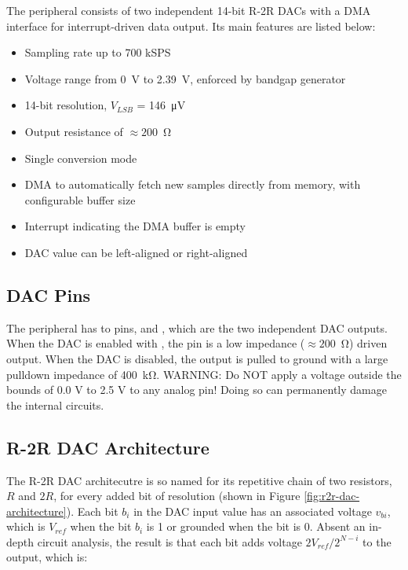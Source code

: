 The  peripheral consists of two independent 14-bit R-2R DACs with a DMA interface for interrupt-driven data output. Its main features are listed below:

\begin{itemize}
	\item Sampling rate up to 700 kSPS
	\item Voltage range from 0~\si{\volt} to 2.39~\si{\volt}, enforced by bandgap generator
	\item 14-bit resolution, $V_{LSB}$ = 146~\si{\micro\volt}
	\item Output resistance of $\approx200$~\si{\ohm}
	\item Single conversion mode
	\item DMA to automatically fetch new samples directly from memory, with configurable buffer size
	\item Interrupt indicating the DMA buffer is empty
	\item DAC value can be left-aligned or right-aligned
\end{itemize}



\subsection{DAC Pins}

The  peripheral has to pins,  and , which are the two independent DAC outputs. When the DAC is enabled with , the pin is a low impedance ($\approx200$~\si{\ohm}) driven output. When the DAC is disabled, the output is pulled to ground with a large pulldown impedance of 400~\si{\kilo\ohm}. WARNING: Do NOT apply a voltage outside the bounds of 0.0 V to 2.5 V to any analog pin! Doing so can permanently damage the internal circuits.



\subsection{R-2R DAC Architecture}

The R-2R DAC architecutre is so named for its repetitive chain of two resistors, $R$ and $2R$, for every added bit of resolution (shown in Figure \ref{fig:r2r-dac-architecture}). Each bit $b_i$ in the DAC input value has an associated voltage $v_{bi}$, which is $V_{ref}$ when the bit $b_i$ is 1 or grounded when the bit is 0. Absent an in-depth circuit analysis, the result is that each bit adds voltage $2V_{ref}/2^{N-i}$ to the output, which is:

